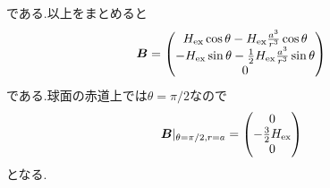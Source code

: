 \documentclass[uplatex,a4j,11pt,dvipdfmx]{jsarticle}
\begin{document}
である.以上をまとめると
\begin{align}
  {\bm B}=\left(
    \begin{matrix}
      H_{\rm ex}\cos\theta-H_{\rm ex}\frac{a^3}{r^3}\cos\theta\\
      -H_{\rm ex}\sin\theta-\frac{1}{2}H_{\rm ex}\frac{a^3}{r^3}\sin\theta\\
      0
    \end{matrix}
  \right)
\end{align}
である.球面の赤道上では$\theta=\pi/2$なので
\begin{align}
  {\bm B}|_{\theta=\pi/2,r=a}=\left(
    \begin{matrix}
      0\\
      -\frac{3}{2}H_{\rm ex}\\
      0
    \end{matrix}
  \right)
\end{align}
となる.

\end{document}
